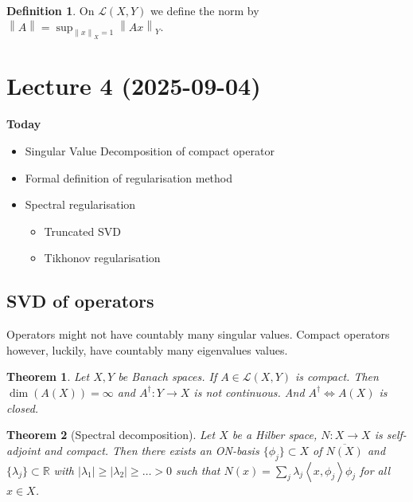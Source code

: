 \documentclass[12pt]{article}
\newtheorem{theorem}{Theorem}[section]
\theoremstyle{definition}
\newtheorem{definition}{Definition}[section]
\newcommand{\real}{\mathbb{R}}   %
\newcommand{\abs}[1]{\left|#1\right|}
\newcommand\norm[1]{\left\lVert#1\right\rVert}
\newcommand\inner[2]{\left\langle#1, #2\right\rangle}
\begin{document}
\begin{definition}
    On $\mathcal{L}(X,Y)$ we define the norm by $\norm{A} = \sup_{\norm{x}_X=1}\norm{Ax}_Y$.
\end{definition}

\newpage
\section{Lecture 4 (2025-09-04)}

\textbf{Today}
\begin{itemize}
    \item Singular Value Decomposition of compact operator
    \item Formal definition of regularisation method
    \item Spectral regularisation
    \begin{itemize}
        \item Truncated SVD
        \item Tikhonov regularisation
    \end{itemize}
\end{itemize}

\subsection{SVD of operators}
Operators might not have countably many singular values. Compact operators however, luckily, have countably many eigenvalues values.

\begin{theorem}
    Let $X,Y$ be Banach spaces. If $A\in\mathcal{L}(X,Y)$ is compact. Then $\dim(A(X)) =\infty$ and $A^\dagger :Y\to X$ is not continuous. And $A^\dagger \Longleftrightarrow A(X)$ is closed. 
\end{theorem}

\begin{theorem}[Spectral decomposition]
    Let $X$ be a Hilber space, $N:X\to X$ is self-adjoint and compact. Then there exists an ON-basis $\{\phi_j\}\subset X$ of $\overline{N(X)}$ and $\{\lambda_j\}\subset \real$ with $\abs{\lambda_1}\geq \abs{\lambda_2} \geq \dots > 0$ such that $N(x) = \sum_j \lambda_j \inner{x}{\phi_j}\phi_j$ for all $x\in X$.
\end{theorem}
\end{document}
